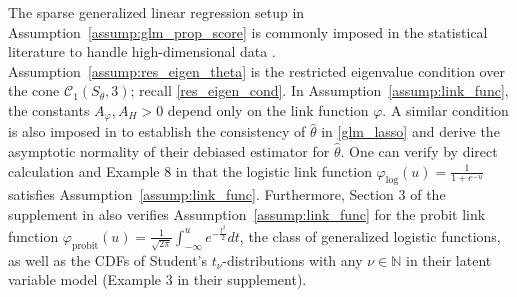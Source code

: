 \documentclass[ejsv2,noshowframe]{imsart}
\theoremstyle{plain}
\theoremstyle{definition}
\theoremstyle{remark}
\renewcommand{\hat}{\widehat}
\begin{document}
The sparse generalized linear regression setup in Assumption~\ref{assump:glm_prop_score} is commonly imposed in the statistical literature to handle high-dimensional data \citep{van2008high,huang2012estimation,cai2023statistical}. Assumption~\ref{assump:res_eigen_theta} is the restricted eigenvalue condition over the cone $\mathcal{C}_1(S_{\theta},3)$; recall \eqref{res_eigen_cond}. In Assumption~\ref{assump:link_func}, the constants $A_{\varphi},A_H>0$ depend only on the link function $\varphi$. A similar condition is also imposed in \cite{cai2023statistical} to establish the consistency of $\hat{\theta}$ in \eqref{glm_lasso} and derive the asymptotic normality of their debiased estimator for $\hat{\theta}$. One can verify by direct calculation and Example 8 in \cite{huang2012estimation} that the logistic link function $\varphi_{\mathrm{log}}(u) = \frac{1}{1+e^{-u}}$ satisfies Assumption~\ref{assump:link_func}. Furthermore, Section 3 of the supplement in \cite{cai2023statistical} also verifies Assumption~\ref{assump:link_func} for the probit link function $\varphi_{\mathrm{probit}}(u)=\frac{1}{\sqrt{2\pi}}\int_{-\infty}^u e^{-\frac{t^2}{2}} dt$, the class of generalized logistic functions, as well as the CDFs of Student's $t_{\nu}$-distributions with any $\nu \in \mathbb{N}$ in their latent variable model (Example 3 in their supplement).
\end{document}
